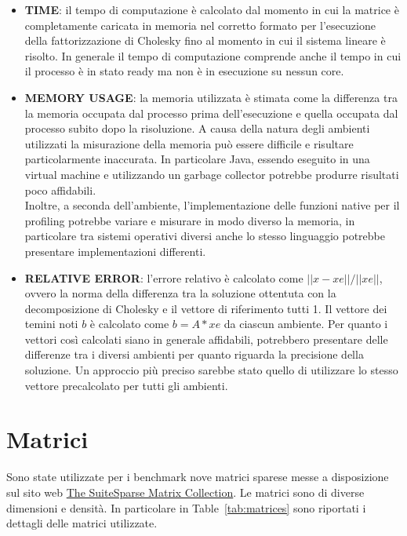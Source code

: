 \documentclass{report}
\begin{document}
            \begin{itemize}
                \item \textbf{TIME}: il tempo di computazione è calcolato dal momento in cui la matrice è completamente
                caricata in memoria nel corretto formato per l'esecuzione della fattorizzazione di Cholesky fino al 
                momento in cui il sistema lineare è risolto. In generale il tempo di computazione comprende anche il 
                tempo in cui il processo è in stato ready ma non è in esecuzione su nessun core.
                \item \textbf{MEMORY USAGE}: la memoria utilizzata è stimata come la differenza tra la memoria occupata 
                dal processo prima dell'esecuzione e quella occupata dal processo subito dopo la risoluzione.
                A causa della natura degli ambienti utilizzati la misurazione della memoria può essere difficile e 
                risultare particolarmente inaccurata. In particolare Java, essendo eseguito in una virtual machine e
                utilizzando un garbage collector potrebbe produrre risultati poco affidabili.\\
                Inoltre, a seconda dell'ambiente, l'implementazione delle funzioni native per il profiling potrebbe 
                variare e misurare in modo diverso la memoria, in particolare tra sistemi operativi diversi anche lo 
                stesso linguaggio potrebbe presentare implementazioni differenti.
                \item \textbf{RELATIVE ERROR}: l'errore relativo è calcolato come $||x-xe||/||xe||$, ovvero la norma 
                della differenza tra la soluzione ottentuta con la decomposizione di Cholesky e il vettore di 
                riferimento tutti 1. Il vettore dei temini noti $b$ è calcolato come $b = A*xe$ da ciascun ambiente.
                Per quanto i vettori così calcolati siano in generale affidabili, potrebbero presentare delle differenze
                tra i diversi ambienti per quanto riguarda la precisione della soluzione. Un approccio più preciso 
                sarebbe stato quello di utilizzare lo stesso vettore precalcolato per tutti gli ambienti.
            \end{itemize}

        \section{Matrici}
            Sono state utilizzate per i benchmark nove matrici sparese messe a disposizione sul sito web 
            \href{https://sparse.tamu.edu/}{The SuiteSparse Matrix Collection}. Le matrici sono di diverse dimensioni 
            e densità. In particolare in Table~\ref{tab:matrices} sono riportati i dettagli delle matrici utilizzate.
\end{document}
